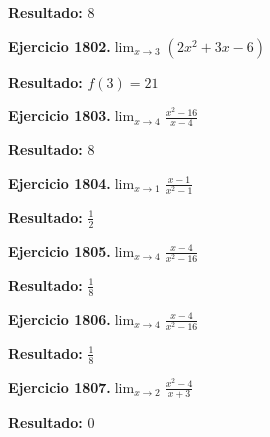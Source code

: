 \documentclass[10pt,a4paper]{article}
\begin{document}
\begin{solbox}
\textbf{Resultado:} \(\displaystyle 8\)
\end{solbox}

\begin{ejbox}
\textbf{Ejercicio 1802.}\quad $\lim_{x\to 3} (2x^2 +3x -6)$
\end{ejbox}

\begin{solbox}
\textbf{Resultado:} \(\displaystyle f(3) = 21\)
\end{solbox}

\begin{ejbox}
\textbf{Ejercicio 1803.}\quad $\lim_{x\to 4} \frac{x^2-16}{x-4}$
\end{ejbox}

\begin{solbox}
\textbf{Resultado:} \(\displaystyle 8\)
\end{solbox}

\newpage
\begin{ejbox}
\textbf{Ejercicio 1804.}\quad $\lim_{x\to 1} \frac{x-1}{x^2-1}$
\end{ejbox}

\begin{solbox}
\textbf{Resultado:} \(\displaystyle \frac{1}{2}\)
\end{solbox}

\begin{ejbox}
\textbf{Ejercicio 1805.}\quad $\lim_{x\to 4} \frac{x-4}{x^2-16}$
\end{ejbox}

\begin{solbox}
\textbf{Resultado:} \(\displaystyle \frac{1}{8}\)
\end{solbox}

\begin{ejbox}
\textbf{Ejercicio 1806.}\quad $\lim_{x\to 4} \frac{x-4}{x^2-16}$
\end{ejbox}

\begin{solbox}
\textbf{Resultado:} \(\displaystyle \frac{1}{8}\)
\end{solbox}

\newpage
\begin{ejbox}
\textbf{Ejercicio 1807.}\quad $\lim_{x\to 2} \frac{x^2-4}{x+3}$
\end{ejbox}

\begin{solbox}
\textbf{Resultado:} \(\displaystyle 0\)
\end{solbox}
\end{document}
